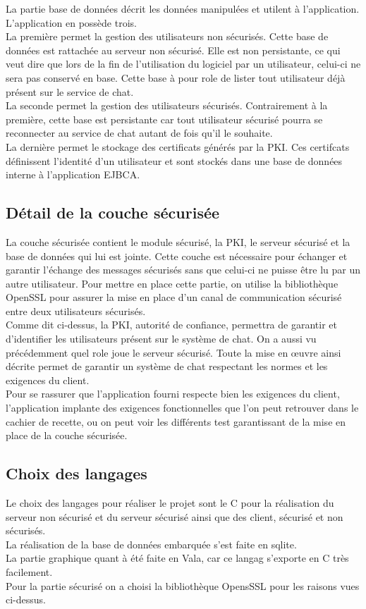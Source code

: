 \documentclass[a4paper,11pt,french]{book}
\begin{document}
La partie base de données décrit les données manipulées et utilent à l'application. L'application en possède trois.\\
La première permet la gestion des utilisateurs non sécurisés. Cette base de données est rattachée au serveur non sécurisé. Elle est non persistante, ce qui veut dire que lors de la fin de l'utilisation du logiciel par un utilisateur, celui-ci ne sera pas conservé en base. Cette base à pour role de lister tout utilisateur déjà présent sur le service de chat.\\
La seconde permet la gestion des utilisateurs sécurisés. Contrairement à la première, cette base est persistante car tout utilisateur sécurisé pourra se reconnecter au service de chat autant de fois qu'il le souhaite.\\ La dernière permet le stockage des certificats générés par la PKI. Ces certifcats définissent l'identité d'un utilisateur et sont stockés dans une base de données interne à l'application EJBCA.

\subsection{Détail de la couche sécurisée}
La couche sécurisée contient le module sécurisé, la PKI, le serveur sécurisé et la base de données qui lui est jointe. Cette couche est nécessaire pour échanger et garantir l'échange des messages sécurisés sans que celui-ci ne puisse être lu par un autre utilisateur. Pour mettre en place cette partie, on utilise la bibliothèque OpenSSL pour assurer la mise en place d'un canal de communication sécurisé entre deux utilisateurs sécurisés.\\Comme dit ci-dessus, la PKI, autorité de confiance, permettra de garantir et d'identifier les utilisateurs présent sur le système de chat. On a aussi vu précédemment quel role joue le serveur sécurisé. Toute la mise en \oe uvre ainsi décrite permet de garantir un système de chat respectant les normes et les exigences du client. \\

Pour se rassurer que l'application fourni respecte bien les exigences du client, l'application implante des exigences fonctionnelles que l'on peut retrouver dans le cachier de recette, ou on peut voir les différents test garantissant de la mise en place de la couche sécurisée.

\subsection{Choix des langages}
Le choix des langages pour réaliser le projet sont le C pour la réalisation du serveur non sécurisé et du serveur sécurisé ainsi que des client, sécurisé et non sécurisés.\\La réalisation de la base de données embarquée s'est faite en sqlite.\\La partie graphique quant à été faite en Vala, car ce langag s'exporte en C très facilement.\\
Pour la partie sécurisé on a choisi la bibliothèque OpensSSL pour les raisons vues ci-dessus.
\end{document}
